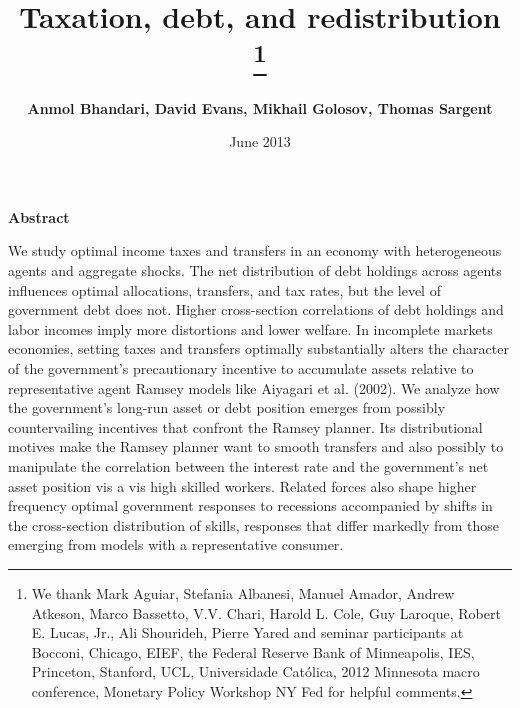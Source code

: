 \documentclass[thmsb,11pt]{article}
\begin{document}
\author{\textbf{Anmol Bhandari, David Evans, Mikhail Golosov, Thomas Sargent}%
}
\title{\textbf{Taxation, debt, and redistribution%
\thanks{%
We thank Mark Aguiar, Stefania Albanesi, Manuel Amador,  Andrew Atkeson, Marco Bassetto, V.V. Chari, Harold
L. Cole, Guy Laroque, Robert E. Lucas, Jr., Ali Shourideh, Pierre Yared and seminar
participants at Bocconi, Chicago, EIEF, the Federal Reserve Bank of
Minneapolis, IES, Princeton, Stanford, UCL, Universidade Cat\'{o}lica, 2012
Minnesota macro conference, Monetary Policy Workshop NY Fed for helpful
comments.}}}
\date{June 2013}
\maketitle

\begin{center}
\textbf{Abstract}
\end{center}
We study optimal income taxes and transfers in an economy with heterogeneous agents and aggregate shocks. The net distribution of debt holdings across agents influences optimal allocations, transfers,  and tax rates, but the level of government debt does not. Higher cross-section correlations of debt holdings and labor incomes imply more distortions and lower welfare. In
incomplete markets economies, setting taxes and transfers optimally substantially alters
the character of the government's precautionary incentive to accumulate assets relative
to  representative agent Ramsey models like Aiyagari et al.
(2002). We analyze how the government's long-run asset or debt position emerges from  possibly countervailing incentives that confront the Ramsey planner. Its distributional motives make the Ramsey planner want  to smooth transfers  and also possibly to manipulate the correlation between
the interest rate and the government's net asset position vis a vis high skilled workers.  Related forces also shape  higher frequency optimal government responses to recessions accompanied
by shifts in the cross-section distribution of skills, responses that differ markedly from those emerging from models with a representative consumer.%


\medskip


%
\end{document}
